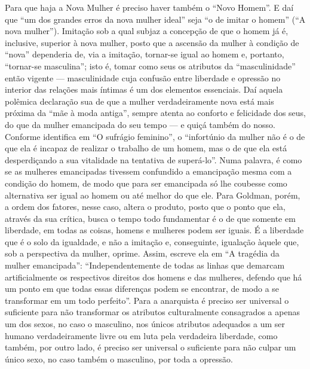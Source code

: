 Para que haja a Nova Mulher é preciso haver também o ``Novo Homem''. E
daí que ``um dos grandes erros da nova mulher ideal'' seja ``o de imitar
o homem'' (``A nova mulher''). Imitação sob a qual subjaz a concepção de
que o homem já é, inclusive, superior à nova mulher, posto que a
ascensão da mulher à condição de ``nova'' dependeria de, via a imitação,
tornar-se igual ao homem e, portanto, ``tornar-se masculina''; isto é,
tomar como seus os atributos da ``masculinidade'' então vigente ---
masculinidade cuja confusão entre liberdade e opressão no interior das
relações mais íntimas é um dos elementos essenciais. Daí aquela polêmica
declaração sua de que a mulher verdadeiramente nova está mais próxima da
``mãe à moda antiga'', sempre atenta ao conforto e felicidade dos seus,
do que da mulher emancipada do seu tempo --- e quiçá também do nosso.
Conforme identifica em ``O sufrágio feminino'', o ``infortúnio da mulher
não é o de que ela é incapaz de realizar o trabalho de um homem, mas o
de que ela está desperdiçando a sua vitalidade na tentativa de
superá-lo''. Numa palavra, é como se as mulheres emancipadas tivessem
confundido a emancipação mesma com a condição do homem, de modo que para
ser emancipada só lhe coubesse como alternativa ser igual ao homem ou
até melhor do que ele. Para Goldman, porém, a ordem dos fatores, nesse
caso, altera o produto, posto que o ponto que ela, através da sua
crítica, busca o tempo todo fundamentar é o de que somente em liberdade,
em todas as coisas, homens e mulheres podem ser iguais. É a liberdade
que é o solo da igualdade, e não a imitação e, conseguinte, igualação
àquele que, sob a perspectiva da mulher, oprime. Assim, escreve ela em
``A tragédia da mulher emancipada'': ``Independentemente de todas as
linhas que demarcam artificialmente os respectivos direitos dos homens e
das mulheres, defendo que há um ponto em que todas essas diferenças
podem se encontrar, de modo a se transformar em um todo perfeito''. Para
a anarquista é preciso ser universal o suficiente para não transformar
os atributos culturalmente consagrados a apenas um dos sexos, no caso o
masculino, nos únicos atributos adequados a um ser humano
verdadeiramente livre ou em luta pela verdadeira liberdade, como também,
por outro lado, é preciso ser universal o suficiente para não culpar um
único sexo, no caso também o masculino, por toda a opressão.

